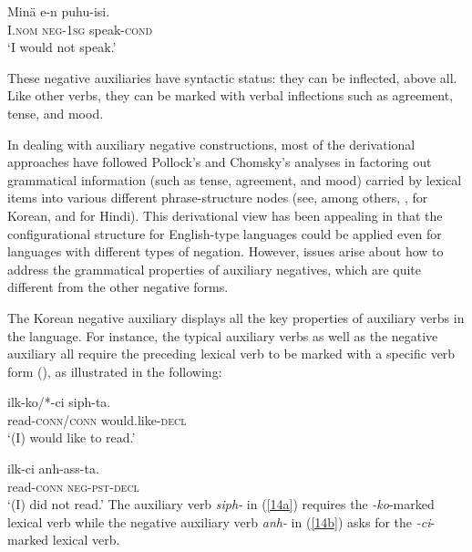\documentclass[output=paper
                ,modfonts
                		,nonflat
	        ,collection
	        ,collectionchapter
	        ,collectiontoclongg
 	        ,biblatex
                ,babelshorthands
                ,newtxmath
                ,draftmode
                ,colorlinks, citecolor=brown
]{./langsci/langscibook}
\begin{document}
{\begin{exe}
\begin{xlist}
\begin{exe}
\begin{xlist}
\ea
\gll Min\"{a} e-n puhu-isi. \\
     I.\textsc{nom} \textsc{neg}-\textsc{1sg} speak-\textsc{cond} \\
\glt `I would not speak.'
\z

\noindent
These negative auxiliaries have syntactic status: they can be
inflected, above all. Like other verbs, they can be marked
with verbal inflections such as agreement, tense, and mood.

In dealing with auxiliary negative constructions,
most of the derivational approaches have
followed Pollock's and Chomsky's analyses in factoring out grammatical
information (such as tense, agreement, and mood) carried by lexical items into various different phrase-structure nodes (see, among others, \citealt{Hagstrom:02}, \citealt{Han:07} for Korean, and \citealt{Vasishth:00} for Hindi).
This derivational view has
been appealing in that the configurational structure for English-type
languages could be applied even for languages with different types
of negation. However, issues arise about how to address the grammatical
properties of auxiliary negatives, which are quite different from the
other negative forms.
%
%
%
%

%


%
The Korean negative auxiliary displays all the key properties of auxiliary verbs in the language. For instance, the typical auxiliary verbs as
well as the negative auxiliary all require the preceding lexical verb to be marked with a specific verb form (\vform), as illustrated
in the following:

\eal
\ex\label{14a}
\gll ilk-ko/*-ci siph-ta. \\
     read-\textsc{conn}/\textsc{conn} would.like-\textsc{decl} \\
\glt `(I) would like to read.'

\ex\label{14b}
\gll ilk-ci anh-ass-ta. \\
     read-\textsc{conn} \textsc{neg}-\textsc{pst}-\textsc{decl} \\
\glt `(I) did not read.'
\zl
\noindent
The auxiliary verb \textit{siph-} in (\ref{14a}) requires the
\textit{-ko}-marked lexical verb while the negative auxiliary
 verb \textit{anh-} in (\ref{14b}) asks for the \textit{-ci}-marked lexical verb.


\end{xlist}
\end{exe}
\end{xlist}
\end{exe}}
\end{document}
